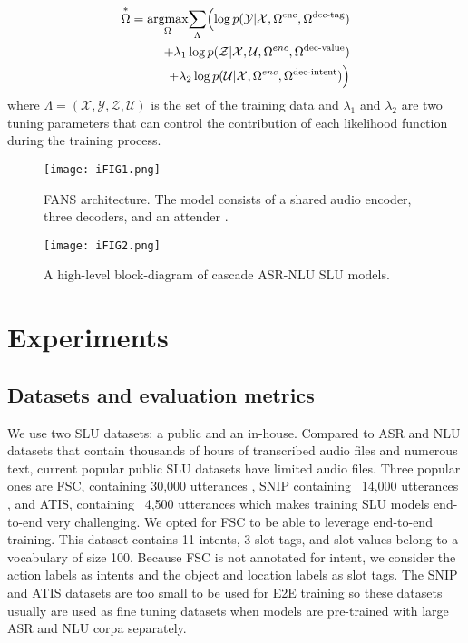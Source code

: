 \documentclass[a4paper]{article}
\begin{document}
 \begin{equation}
 \begin{aligned}
\overset{*}{\Omega} = \underset{\Omega}{\text{argmax}}   \underset{\Lambda}{\sum} \Bigl( \log p(\mathcal{Y }|\mathcal{X},\Omega^{\text{enc}},\Omega^{\text{dec-tag}})&\\
 +\lambda_1 \log p(\mathcal{Z} |\mathcal{X},\mathcal{U},\Omega^{enc},\Omega^{\text{dec-value}})&\\
+ \lambda_2 \log p(\mathcal{U} |\mathcal{X},\Omega^{enc},\Omega^{\text{dec-intent}})\Bigr)\\
 \end{aligned}
 \end{equation}
where $\Lambda=(\mathcal{X},\mathcal{Y},\mathcal{Z},\mathcal{U})$ is  the set of the training data and $\lambda_1$ and $\lambda_2$ are two tuning parameters that can control the contribution of each likelihood function during the training process.

  
 
 \begin{figure}[t]
  \centering
  \texttt{[image: iFIG1.png]}
  \caption{ FANS architecture. The model consists of a shared audio encoder, three decoders, and an attender .}
  \label{fig:fans}
\end{figure}




\begin{figure}[t]
  \centering
  \texttt{[image: iFIG2.png]}
  \caption{ A high-level block-diagram of cascade ASR-NLU SLU models.}
  \label{fig:slutask}
\end{figure}


 


 \section{Experiments}
 \subsection{Datasets and evaluation metrics}
 We use  two SLU datasets:  a public and  an  in-house. Compared to ASR and NLU datasets that contain thousands of  hours of transcribed audio files and numerous text, current popular public SLU  datasets have limited audio files. Three popular ones are FSC,  containing 30,000 utterances \cite{lugosch2019speech}, SNIP containing ~14,000 utterances \cite{coucke2018snips}, and ATIS, containing ~4,500 utterances \cite{price1990evaluation} which makes training SLU models end-to-end very challenging.   We opted for FSC  \cite{lugosch2019speech}  to be able to leverage end-to-end training. This dataset contains 11 intents, 3 slot tags, and slot values belong to a vocabulary of size 100. Because FSC is not annotated for intent, we consider the action labels as intents and the object and location labels as slot tags.  The SNIP and ATIS datasets are too small to be used for E2E training so these datasets usually are used as fine tuning datasets when models are pre-trained with large ASR and NLU corpa separately.
 
\end{document}
